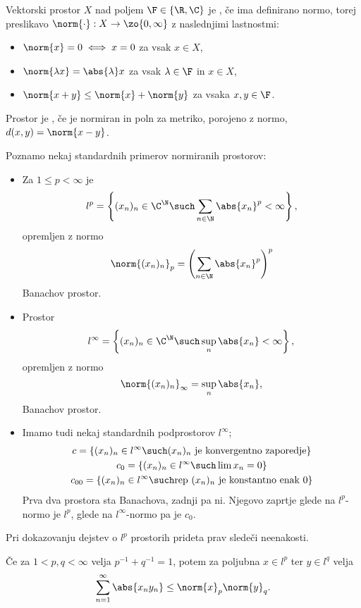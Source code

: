 
Vektorski prostor $X$ nad poljem $\F \in \{\R, \C\}$ je , če ima
definirano normo, torej preslikavo $\norm{\cdot}: X \to \zo{0, \infty}$ z
naslednjimi lastnostmi:
\begin{itemize}
\item $\norm{x} = 0 \iff x = 0$ za vsak $x \in X$,
\item $\norm{\lambda x} = \abs{\lambda} x$ za vsak $\lambda \in \F$ in $x \in
  X$,
\item $\norm{x+y} \le \norm{x} + \norm{y}$ za vsaka $x, y \in \F$.
\end{itemize}
Prostor je , če je normiran in poln za metriko, porojeno z
normo, $d(x,y) = \norm{x-y}$.

Poznamo nekaj standardnih primerov normiranih prostorov:
\begin{itemize}
\item Za $1 \le p < \infty$ je
  \[
	l^p = \left\{ (x_n)_n \in \C^\N \such \sum_{n \in \N} \abs{x_n}^p < \infty
	\right\},
  \]
  opremljen z normo
  \[
	\norm{(x_n)_n}_p = \left( \sum_{n \in \N} \abs{x_n}^p \right)^p
  \]
  Banachov prostor.
\item Prostor
  \[
	l^\infty = \left\{ (x_n)_n \in \C^\N \such \sup_n \abs{x_n} < \infty \right\},
  \]
  opremljen z normo
  \[
	\norm{(x_n)_n}_\infty = \sup_n \abs{x_n},
  \]
  Banachov prostor.
\item Imamo tudi nekaj standardnih podprostorov $l^\infty$;
  \begin{gather*}
	c = \{(x_n)_n \in l^\infty \such \text{$(x_n)_n$ je konvergentno
	  zaporedje}\} \\
	c_0 = \{(x_n)_n \in l^\infty \such \lim x_n = 0\} \\
	c_{00} = \{ (x_n)_n \in l^\infty \such \text{rep $(x_n)_n$ je konstantno
	  enak $0$} \}
  \end{gather*}
  Prva dva prostora sta Banachova, zadnji pa ni.
  Njegovo zaprtje glede na $l^p$-normo je $l^p$, glede na $l^\infty$-normo pa je
  $c_0$.
\end{itemize}

Pri dokazovanju dejstev o $l^p$ prostorih prideta prav sledeči neenakosti.

\begin{trditev}
  Če za $1 < p, q < \infty$ velja $p^{-1} + q^{-1} = 1$, potem za poljubna $x
  \in l^p$ ter $y \in l^q$ velja
  \[
	\sum_{n=1}^\infty \abs{x_n y_n} \le \norm{x}_p \norm{y}_q.
  \]
\end{trditev}

